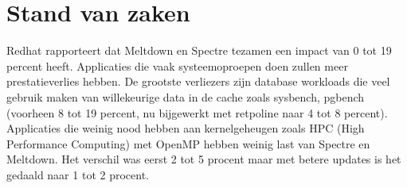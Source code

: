 \chapter{Stand van zaken}
\label{ch:stand-van-zaken}









Redhat rapporteert dat Meltdown en Spectre tezamen een impact van 0 tot 19 percent heeft.
Applicaties die vaak systeemoproepen doen zullen meer prestatieverlies hebben. 
De grootste verliezers zijn database workloads die veel gebruik maken van willekeurige data in de cache zoals sysbench, pgbench (voorheen 8 tot 19 percent, nu bijgewerkt met retpoline naar 4 tot 8 percent).
Applicaties die weinig nood hebben aan kernelgeheugen zoals HPC (High Performance Computing) met OpenMP hebben weinig last van Spectre en Meltdown. Het verschil was eerst 2 tot 5 procent maar met betere updates is het gedaald naar 1 tot 2 procent.



